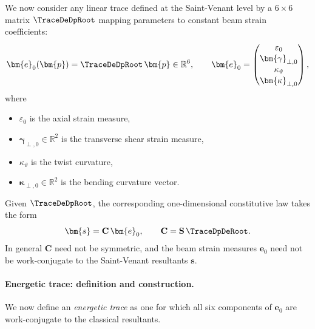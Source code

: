 We now consider any linear trace defined at the Saint-Venant level by a
$6\times 6$ matrix $\TraceDeDpRoot$ mapping parameters to constant beam strain
coefficients:
\begin{equation}
\bm{e}_0(\bm{p})
=
\TraceDeDpRoot\,\bm{p}
\in \mathbb{R}^6,
\qquad
\bm{e}_0 =
\begin{pmatrix}
\varepsilon_0 \\[1pt]
\bm{\gamma}_{\perp,0} \\[1pt]
\kappa_\vartheta \\[1pt]
\bm{\kappa}_{\perp,0}
\end{pmatrix},
\label{eq:def-e0}
\end{equation}
where
\begin{itemize}
\item $\varepsilon_0$ is the axial strain measure,
\item $\bm{\gamma}_{\perp,0} \in \mathbb{R}^2$ is the transverse shear strain
      measure,
\item $\kappa_\vartheta$ is the twist curvature,
\item $\bm{\kappa}_{\perp,0} \in \mathbb{R}^2$ is the bending curvature
      vector.
\end{itemize}
Given $\TraceDeDpRoot$, the corresponding one-dimensional constitutive law takes
the form
\begin{equation}
\bm{s} = \mathbf{C}\,\bm{e}_0,
\qquad
\mathbf{C} = \mathbf{S}\,\TraceDpDeRoot.
\label{eq:def-C-from-T0}
\end{equation}
In general $\mathbf{C}$ need not be symmetric, and the beam strain measures
$\bm{e}_0$ need not be work-conjugate to the Saint-Venant resultants
$\bm{s}$.

\paragraph{Energetic trace: definition and construction.}

We now define an \emph{energetic trace} as one for which all six components of
$\bm{e}_0$ are work-conjugate to the classical resultants.

